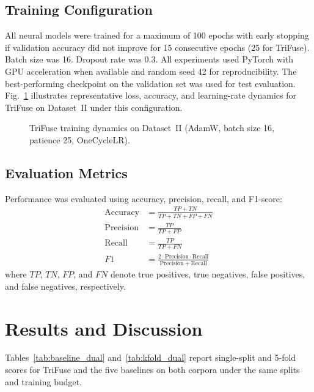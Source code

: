 \subsection{Training Configuration}

All neural models were trained for a maximum of 100 epochs with early stopping if validation accuracy did not improve for 15 consecutive epochs (25 for TriFuse). Batch size was 16. Dropout rate was 0.3. All experiments used PyTorch with GPU acceleration when available and random seed 42 for reproducibility. The best-performing checkpoint on the validation set was used for test evaluation. Fig.~\ref{fig:training} illustrates representative loss, accuracy, and learning-rate dynamics for TriFuse on Dataset~II under this configuration.

\begin{figure}[!t]
\centering

\caption{TriFuse training dynamics on Dataset~II (AdamW, batch size 16, patience 25, OneCycleLR).}
\label{fig:training}
\end{figure}

\subsection{Evaluation Metrics}

Performance was evaluated using accuracy, precision, recall, and F1-score:
\begin{equation}
\begin{aligned}
\mathrm{Accuracy} &= \frac{TP + TN}{TP + TN + FP + FN} \\
\mathrm{Precision} &= \frac{TP}{TP + FP} \\
\mathrm{Recall} &= \frac{TP}{TP + FN} \\
F1 &= \frac{2 \cdot \mathrm{Precision} \cdot \mathrm{Recall}}{\mathrm{Precision} + \mathrm{Recall}}
\end{aligned}
\end{equation}
where $TP$, $TN$, $FP$, and $FN$ denote true positives, true negatives, false positives, and false negatives, respectively.

\section{Results and Discussion}

Tables~\ref{tab:baseline_dual} and~\ref{tab:kfold_dual} report single-split and 5-fold scores for TriFuse and the five baselines on both corpora under the same splits and training budget.

